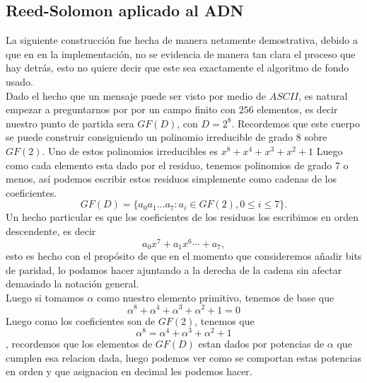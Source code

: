 
\subsection{Reed-Solomon aplicado al ADN}
La siguiente construcción fue hecha de manera netamente demostrativa, debido a que en en la implementación, no se evidencia de manera tan clara el proceso que hay detrás, esto no quiere decir que este sea exactamente el algoritmo de fondo usado.\\

Dado el hecho que un mensaje puede ser visto por medio de $ASCII$, es natural empezar a preguntarnos por por un campo finito con $256$ elementos, es decir nuestro punto de partida sera $GF(D)$, con $D=2^8.$ Recordemos que este cuerpo se puede construir consiguiendo un polinomio irreducible de grado $8$ sobre $GF(2)$. Uno de estos polinomios irreducibles es $x^8+x^4+x^3+x^2+1$  Luego como cada elemento esta dado por el residuo, tenemos polinomios de grado $7$ o menos, así podemos escribir estos residuos simplemente como cadenas de los coeficientes.
$$GF(D)=\{a_0a_1\ldots a_7: a_i\in GF(2), 0\leq i\leq 7\}.$$
Un hecho particular es que los coeficientes de los residuos los escribimos en orden descendente, es decir
$$a_0x^7+a_1x^6\cdots+a_7,$$
esto es hecho con el propósito de que en el momento que consideremos añadir bits de paridad, lo podamos hacer ajuntando a la derecha de la cadena sin afectar demasiado la notación general.\\
Luego si tomamos $\alpha$ como nuestro elemento primitivo, tenemos de base que 
$$\alpha^8+\alpha^4+\alpha^3+\alpha^2+1=0$$
Luego como los coeficientes son de $GF(2)$, tenemos que
$$\alpha^8=\alpha^4+\alpha^3+\alpha^2+1$$, recordemos que los elementos de $GF(D)$ estan dados por potencias de $\alpha$ que cumplen esa relacion dada, luego podemos ver como se comportan estas potencias en orden y que asignacion en decimal les podemos hacer.
